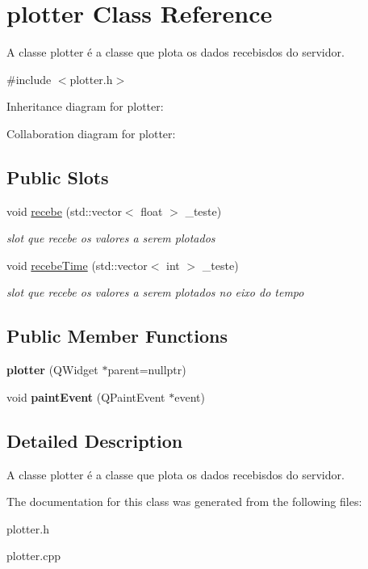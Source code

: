 \hypertarget{classplotter}{}\section{plotter Class Reference}
\label{classplotter}


A classe plotter é a classe que plota os dados recebisdos do servidor.  




{\ttfamily \#include $<$plotter.\+h$>$}



Inheritance diagram for plotter\+:


Collaboration diagram for plotter\+:
\subsection*{Public Slots}
\begin{DoxyCompactItemize}
\item 
void \hyperlink{classplotter_a699a6ac7e3a65f3665c30106b9122e8f}{recebe} (std\+::vector$<$ float $>$ \+\_\+teste)\hypertarget{classplotter_a699a6ac7e3a65f3665c30106b9122e8f}{}\label{classplotter_a699a6ac7e3a65f3665c30106b9122e8f}

\begin{DoxyCompactList}\small\item\em slot que recebe os valores a serem plotados \end{DoxyCompactList}\item 
void \hyperlink{classplotter_a599092bc10d848627bb5d90dd74b5d72}{recebe\+Time} (std\+::vector$<$ int $>$ \+\_\+teste)\hypertarget{classplotter_a599092bc10d848627bb5d90dd74b5d72}{}\label{classplotter_a599092bc10d848627bb5d90dd74b5d72}

\begin{DoxyCompactList}\small\item\em slot que recebe os valores a serem plotados no eixo do tempo \end{DoxyCompactList}\end{DoxyCompactItemize}
\subsection*{Public Member Functions}
\begin{DoxyCompactItemize}
\item 
{\bfseries plotter} (Q\+Widget $\ast$parent=nullptr)\hypertarget{classplotter_a6132b1d35e08cf0345c6ae6cc4ed5618}{}\label{classplotter_a6132b1d35e08cf0345c6ae6cc4ed5618}

\item 
void {\bfseries paint\+Event} (Q\+Paint\+Event $\ast$event)\hypertarget{classplotter_ac1fd83a3a57494cdacbe03fa28c98ce5}{}\label{classplotter_ac1fd83a3a57494cdacbe03fa28c98ce5}

\end{DoxyCompactItemize}


\subsection{Detailed Description}
A classe plotter é a classe que plota os dados recebisdos do servidor. 

The documentation for this class was generated from the following files\+:\begin{DoxyCompactItemize}
\item 
plotter.\+h\item 
plotter.\+cpp\end{DoxyCompactItemize}
